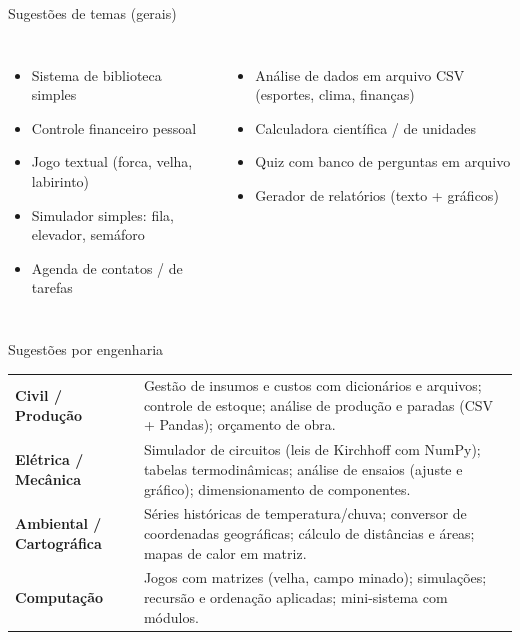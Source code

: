 \documentclass[aspectratio=169,10pt,t]{beamer}
\begin{document}
\begin{frame}{Sugestões de temas (gerais)}
  \begin{columns}[T]
    \begin{itemize}
      \item Sistema de biblioteca simples
      \item Controle financeiro pessoal
      \item Jogo textual (forca, velha, labirinto)
      \item Simulador simples: fila, elevador, semáforo
      \item Agenda de contatos / de tarefas
    \end{itemize}
    \begin{itemize}
      \item Análise de dados em arquivo CSV (esportes, clima, finanças)
      \item Calculadora científica / de unidades
      \item Quiz com banco de perguntas em arquivo
      \item Gerador de relatórios (texto + gráficos)
    \end{itemize}
  \end{columns}
\end{frame}

\begin{frame}{Sugestões por engenharia}
  \small
  \begin{tabular}{@{}p{3.6cm}p{8.6cm}@{}}
    \toprule
    \textbf{Civil / Produção} & Gestão de insumos e custos com dicionários e arquivos; controle de estoque; análise de produção e paradas (CSV + Pandas); orçamento de obra.\\
    \textbf{Elétrica / Mecânica} & Simulador de circuitos (leis de Kirchhoff com NumPy); tabelas termodinâmicas; análise de ensaios (ajuste e gráfico); dimensionamento de componentes.\\
    \textbf{Ambiental / Cartográfica} & Séries históricas de temperatura/chuva; conversor de coordenadas geográficas; cálculo de distâncias e áreas; mapas de calor em matriz.\\
    \textbf{Computação} & Jogos com matrizes (velha, campo minado); simulações; recursão e ordenação aplicadas; mini-sistema com módulos.\\
    \bottomrule
  \end{tabular}
\end{frame}
\end{document}
